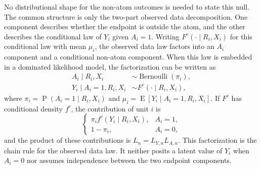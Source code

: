 \documentclass[11pt]{article}
\DeclareMathOperator{\E}{E}
\DeclareMathOperator{\Prob}{P}
\DeclareMathOperator{\Bernoulli}{Bernoulli}
\begin{document}
No distributional shape for the non-atom outcomes is needed to state this null.
The common structure is only the two-part observed data decomposition. One
component describes whether the endpoint is outside the atom, and the other
describes the conditional law of $Y_i$ given $A_i=1$. Writing $F^c(\cdot\mid R_i,X_i)$ for this conditional law with mean $\mu_i$, the observed data law factors into
an $A_i$ component and a conditional non-atom component. When this law is embedded in a dominated likelihood model, the factorization can be
written as
\begin{align*}
  A_i \mid R_i, X_i &\sim \Bernoulli(\pi_i),\\
  Y_i \mid A_i = 1, R_i, X_i &\sim F^c(\cdot\mid R_i,X_i),
\end{align*}
where $\pi_i=\Prob(A_i=1\mid R_i,X_i)$ and $\mu_i=\E[Y_i\mid A_i=1,R_i,X_i]$. If $F^c$ has conditional density $f^c$, the contribution of unit $i$ is
\[
  \begin{cases}
    \pi_i f^c(Y_i\mid R_i,X_i), & A_i=1,\\
    1-\pi_i, & A_i=0,
  \end{cases}
\]
and the product of these contributions is $L_n=L_{Y,n}L_{A,n}$.
This factorization is the chain rule for the observed data law. It neither posits a latent value of $Y_i$ when $A_i=0$ nor assumes independence between the two endpoint components.
\end{document}
